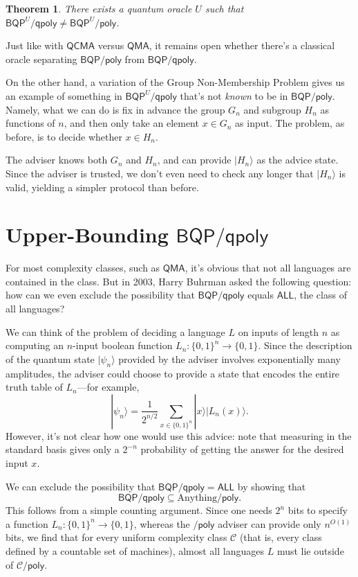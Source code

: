 \documentclass[11pt]{report}
\theoremstyle{plain}
\newtheorem{theorem}{Theorem}[section]
\theoremstyle{definition}
\renewcommand{\ket}[1]{|#1\rangle}
\begin{document}
\begin{theorem}
There exists a quantum oracle $U$ such that $\mathsf{BQP}^U\mathsf{/qpoly} \neq \mathsf{BQP}^U\mathsf{/poly}$.
\end{theorem}

Just like with $\mathsf{QCMA}$ versus $\mathsf{QMA}$, it remains open whether there's a classical oracle separating $\mathsf{BQP/poly}$ from $\mathsf{BQP/qpoly}$.

On the other hand, a variation of the Group Non-Membership Problem gives us an example of something in $\mathsf{BQP}^U\mathsf{/qpoly}$ that's not {\em known} to
be in $\mathsf{BQP/poly}$.  Namely, what we can do is fix in advance the group $G_n$ and subgroup $H_n$ as functions of $n$, and then only take an element $x\in G_n$ as input.  The problem, as before, is to decide whether $x\in H_n$.

The adviser knows both $G_n$ and $H_n$, and can provide $\ket{H_n}$ as the advice state.
Since the adviser is trusted, we don't even need to check any longer that $\ket{H_n}$ is valid, yielding a simpler protocol than before.

\section{Upper-Bounding $\mathsf{BQP/qpoly}$}

For most complexity classes, such as $\mathsf{QMA}$, it's obvious that not all languages are contained in the class.
But in 2003, Harry Buhrman asked the following question: how can we even exclude the possibility that $\mathsf{BQP}/\mathsf{qpoly}$ equals $\mathsf{ALL}$, the class of all languages?

We can think of the problem of deciding a language $L$ on inputs of length $n$ as computing an $n$-input boolean function $L_n:\{0,1\}^n \rightarrow \{0,1\}$.
Since the description of the quantum state $\ket{\psi_n}$ provided by the adviser involves exponentially many amplitudes, the adviser could choose to provide a state that encodes the entire truth table of $L_n$---for example,
$$\ket{\psi_n} = \frac{1}{2^{n/2}} \sum_{x\in\{0,1\}^n} \ket{x}\ket{L_n(x)}.$$
However, it's not clear how one would use this advice: note that measuring in the standard basis gives only a $2^{-n}$ probability of getting the answer for the desired input $x$.

We can exclude the possibility that $\mathsf{BQP/qpoly} = \mathsf{ALL}$ by showing that
\begin{equation}
  \mathsf{BQP} / \mathsf{qpoly} \subseteq \text{Anything} / \mathsf{poly}.
\end{equation}
This follows from a simple counting argument.  Since one needs $2^n$ bits to specify a function $L_n : \{0,1\}^n\rightarrow \{0,1\}$, whereas the $\mathsf{/poly}$ adviser can provide only $n^{O(1)}$ bits, we find that for every uniform complexity class $\mathcal{C}$ (that is, every class defined by
a countable set of machines), almost all languages $L$ must lie outside of $\mathcal{C}\mathsf{/poly}$.
\end{document}
